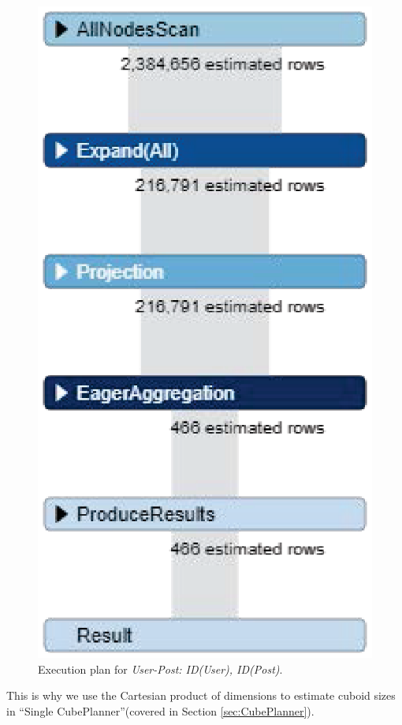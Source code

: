 \begin{figure}
	\centering
	\includegraphics[scale=0.7]{pic/wrong2.eps}
	\caption{Execution plan for \textit{User-Post: ID(User), ID(Post)}.}
	\label{fig:wrong2}
\end{figure}

This is why we use the Cartesian product of dimensions to estimate cuboid sizes in ``Single CubePlanner''(covered in Section \ref{sec:CubePlanner}).
